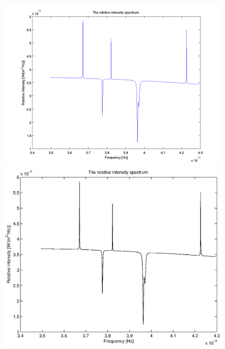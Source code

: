 \documentclass[10pt, a4paper]{article}
\begin{document}
\begin{figure}[hbt]
\begin{center}
\ifpdf
	\includegraphics[width=\linewidth]{../img/spectrum_relative.png}
\else
	\includegraphics[width=\linewidth]{../img/spectrum_relative.eps}
\fi
\end{center}
\caption{}
\label{fig:rellspec}
\end{figure}
\end{document}
